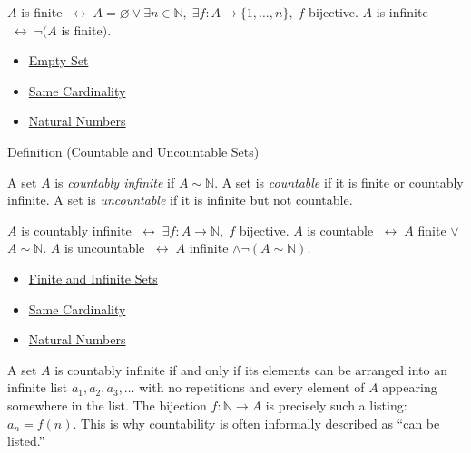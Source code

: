 \begin{remark*}
$A$ is finite $\;\leftrightarrow\; A = \varnothing \vee \exists n\in\mathbb{N},\; \exists f: A\to\{1,\dots,n\},\; f$ bijective. $A$ is infinite $\;\leftrightarrow\; \neg(A$ is finite$)$.
\end{remark*}


\begin{dependencies}
\begin{itemize}
  \item \hyperref[def:empty-set]{Empty Set}
  \item \hyperref[def:same-cardinality]{Same Cardinality}
  \item \hyperref[def:natural-numbers]{Natural Numbers}
\end{itemize}
\end{dependencies}

\begin{definitionbox}{Definition (Countable and Uncountable Sets)}
\begin{definition}\label{def:countable}
A set $A$ is \emph{countably infinite} if $A \sim \mathbb{N}$. A set is
\emph{countable} if it is finite or countably infinite. A set is
\emph{uncountable} if it is infinite but not countable.
\end{definition}
\end{definitionbox}

\begin{remark*}
$A$ is countably infinite $\;\leftrightarrow\; \exists f: A\to\mathbb{N},\; f$ bijective. $A$ is countable $\;\leftrightarrow\; A$ finite $\vee$ $A\sim\mathbb{N}$. $A$ is uncountable $\;\leftrightarrow\; A$ infinite $\wedge \neg(A\sim\mathbb{N})$.
\end{remark*}


\begin{dependencies}
\begin{itemize}
  \item \hyperref[def:finite-infinite]{Finite and Infinite Sets}
  \item \hyperref[def:same-cardinality]{Same Cardinality}
  \item \hyperref[def:natural-numbers]{Natural Numbers}
\end{itemize}
\end{dependencies}

\begin{remark*}
A set $A$ is countably infinite if and only if its elements can be arranged
into an infinite list $a_1, a_2, a_3, \dots$ with no repetitions and every
element of $A$ appearing somewhere in the list. The bijection $f : \mathbb{N}
\to A$ is precisely such a listing: $a_n = f(n)$. This is why countability is
often informally described as ``can be listed.''
\end{remark*}

